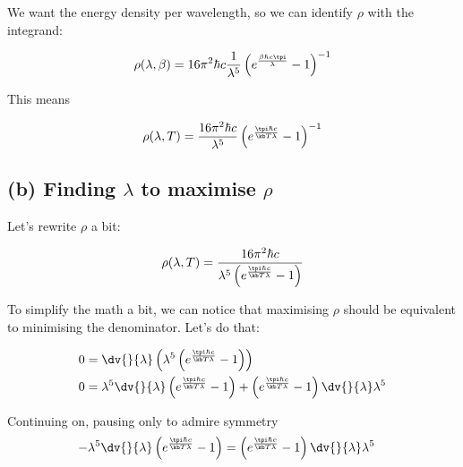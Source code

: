 \documentclass[../../PS3.tex]{subfiles}
\begin{document}
We want the energy density per wavelength, so we can identify $\rho$ with the integrand:

\begin{equation}
	\rho(\lambda,\beta) = 16 \pi^2 \hbar c \frac{1}{\lambda^5} \left(e^{ \frac{\beta \hbar c \tpi}{\lambda}} - 1\right)^{-1}
\end{equation}

This means 

\begin{equation}
	\rho(\lambda,T) =  \frac{16 \pi^2 \hbar c}{\lambda^5} \left(e^{ \frac{\tpi \hbar c }{\kb T \lambda}} - 1\right)^{-1}
\end{equation}

\subsection*{(b) Finding $\lambda$ to maximise $\rho$}

Let's rewrite $\rho$ a bit:

\begin{equation}
	\rho(\lambda,T) =  \frac{16 \pi^2 \hbar c}{\lambda^5 \left(e^{ \frac{\tpi \hbar c }{\kb T \lambda}} - 1\right)}
\end{equation}

To simplify the math a bit, we can notice that maximising $\rho$ should be equivalent to minimising the denominator. Let's do that:

\begin{align}
	0 &= \dv{}{\lambda} \left( \lambda^5 \left(e^{ \frac{\tpi \hbar c }{\kb T \lambda}} - 1\right)\right) \\
	0 &= \lambda^5 \dv{}{\lambda} \left(e^{ \frac{\tpi \hbar c }{\kb T \lambda}} - 1\right) + \left(e^{ \frac{\tpi \hbar c }{\kb T \lambda}} - 1\right)\dv{}{\lambda} \lambda^5 
\end{align}

Continuing on, pausing only to admire symmetry
\begin{align}
	- \lambda^5 \dv{}{\lambda} \left(e^{ \frac{\tpi \hbar c }{\kb T \lambda}} - 1\right) &= \left(e^{ \frac{\tpi \hbar c }{\kb T \lambda}} - 1\right)\dv{}{\lambda} \lambda^5 
\end{align}
\end{document}

